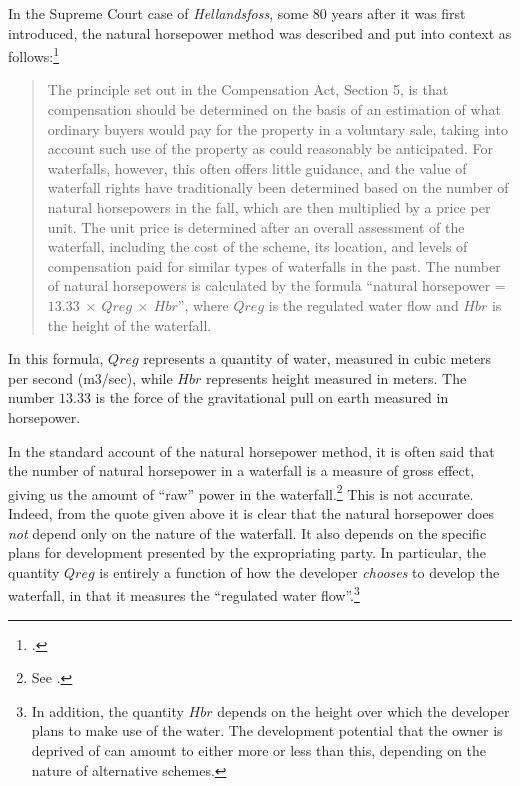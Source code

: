 In the Supreme Court case of \emph{Hellandsfoss}, some 80 years after it was first introduced, the natural horsepower method was described and put into context as follows:\footcite[1599]{hellandsfoss97}
\begin{quote}
The principle set out in the Compensation Act, Section 5, is that compensation should be determined on the basis of an estimation of what ordinary buyers would pay for the property in a voluntary sale, taking into account such use of the property as could reasonably be anticipated. For waterfalls, however, this often offers little guidance, and the value of waterfall rights have traditionally been determined based on the number of natural horsepowers in the fall, which are then multiplied by a price per unit. The unit price is determined after an overall assessment of the waterfall, including the cost of the scheme, its location, and levels of compensation paid for similar types of waterfalls in the past. The number of natural horsepowers is calculated by the formula ``natural horsepower = $13.33 \ \times \ Qreg \ \times \ Hbr$'', where $Qreg$ is the regulated water flow and $Hbr$ is the height of the waterfall.
\end{quote}

In this formula, $Qreg$ represents a quantity of water, measured in cubic meters per second (m3/sec), while $Hbr$ represents height measured in meters. The number $13.33$ is the force of the gravitational pull on earth measured in horsepower. 

In the standard account of the natural horsepower method, it is often said that the number of natural horsepower in a waterfall is a measure of gross effect, giving us the amount of ``raw'' power in the waterfall.\footnote{See \cite{falkanger02}.} This is not accurate. Indeed, from the quote given above it is clear that the natural horsepower does {\it not} depend only on the nature of the waterfall. It also depends on the specific plans for development presented by the expropriating party. In particular, the quantity $Qreg$ is entirely a function of how the developer {\it chooses} to develop the waterfall, in that it measures the ``regulated water flow''.\footnote{In addition, the quantity $Hbr$ depends on the height over which the developer plans to make use of the water. The development potential that the owner is deprived of can amount to either more or less than this, depending on the nature of alternative schemes.}

